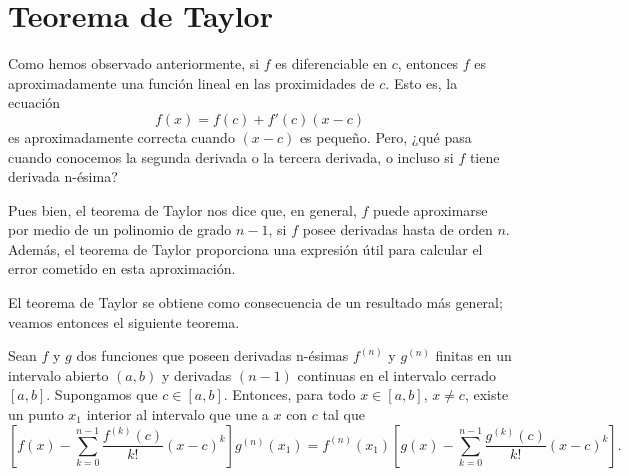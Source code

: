 \section{Teorema de Taylor}

Como hemos observado anteriormente, si $f$ es diferenciable en $c$, entonces $f$ es aproximadamente una función lineal en las proximidades de $c$. Esto es, la ecuación
\[
f(x)=f(c)+f'(c)(x-c)
\]
es aproximadamente correcta cuando $(x-c)$ es pequeño. Pero, ¿qué pasa cuando conocemos la segunda derivada o la tercera derivada, o incluso si $f$ tiene derivada n-ésima?

Pues bien, el teorema de Taylor nos dice que, en general, $f$ puede aproximarse por medio de un polinomio de grado $n-1$, si $f$ posee derivadas hasta de orden $n$. Además, el teorema de Taylor proporciona una expresión útil para calcular el error cometido en esta aproximación.

El teorema de Taylor se obtiene como consecuencia de un resultado más general; veamos entonces el siguiente teorema.

\begin{teorema}
    Sean $f$ y $g$ dos funciones que poseen derivadas n-ésimas $f^{(n)}$ y $g^{(n)}$ finitas en un intervalo abierto $(a,b)$ y derivadas $(n-1)$ continuas en el intervalo cerrado $[a,b]$. Supongamos que $c\in[a,b]$. Entonces, para todo $x\in[a,b]$, $x\neq c$, existe un punto $x_{1}$ interior al intervalo que une a $x$ con $c$ tal que
    \[
    \left[ f(x)-\sum_{k=0}^{n-1}\frac{f^{(k)}(c)}{k!}(x-c)^{k} \right]g^{(n)}(x_{1})
    =
    f^{(n)}(x_{1})\left[ g(x)-\sum_{k=0}^{n-1}\frac{g^{(k)}(c)}{k!}(x-c)^{k} \right].
    \]
\end{teorema}

